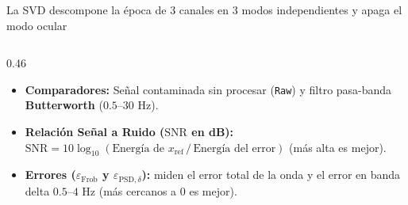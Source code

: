 \documentclass[aspectratio=169,9pt]{beamer}
\begin{document}
\begin{frame}{La SVD descompone la \'epoca de 3 canales en 3 modos independientes y apaga el modo ocular}
\begin{columns}[T,onlytextwidth]
\begin{column}{0.46\textwidth}
      \begin{tcolorbox}[ambercard, title={\scriptsize\bfseries Comparadores y M\'etricas de Evaluaci\'on}, colbacktitle=UDAmber!85!black, coltitle=white]
        \scriptsize
        \begin{itemize}\setlength{\itemsep}{1pt}
          \item \textbf{Comparadores:} Se\~nal contaminada sin procesar (\texttt{Raw}) y filtro pasa-banda \textbf{Butterworth} ($0.5\text{--}30\text{ Hz}$).
          \item \textbf{Relaci\'on Se\~nal a Ruido ($\text{SNR}$ en dB):}
            $\text{SNR} = 10\log_{10}\!\left(\text{Energ\'ia de } x_{\text{ref}} \,/\, \text{Energ\'ia del error}\right)$ (m\'as alta es mejor).
          \item \textbf{Errores ($\varepsilon_{\text{Frob}}$ y $\varepsilon_{\text{PSD},\delta}$):} miden el error total de la onda y el error en banda delta $0.5\text{--}4\text{ Hz}$ (m\'as cercanos a $0$ es mejor).
        \end{itemize}
      \end{tcolorbox}
    \end{column}
  \end{columns}
\end{frame}
\end{document}
